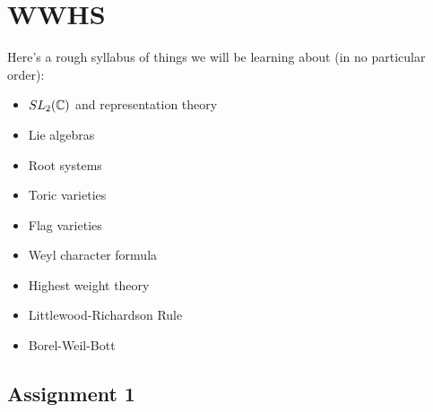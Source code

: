 \documentclass{../mathnotes}
\begin{document}
\section{WWHS}

Here's a rough syllabus of things we will be learning about (in no particular order):
\begin{itemize}
    \item $SL_2(\mathbb{C})$ and representation theory
    \item Lie algebras
    \item Root systems
    \item Toric varieties
    \item Flag varieties
    \item Weyl character formula
    \item Highest weight theory
    \item Littlewood-Richardson Rule
    \item Borel-Weil-Bott
\end{itemize}

\subsection{Assignment 1}
\end{document}
